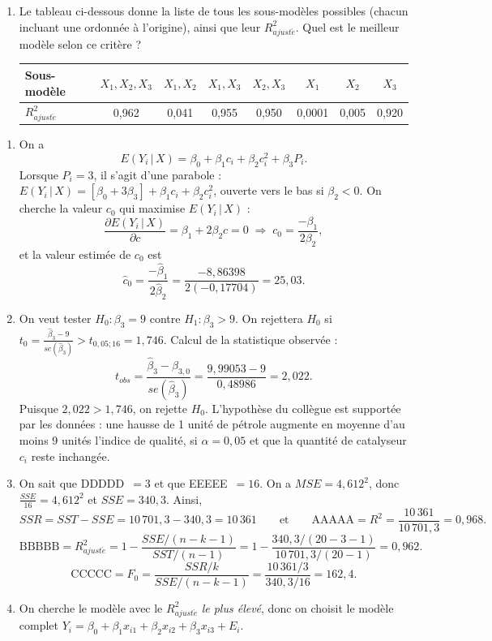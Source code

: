\begin{exercice}
\begin{enumerate}[label=(\alph*)]
  \item Le tableau ci-dessous donne la liste de tous les sous-modèles possibles (chacun
  incluant une ordonnée à l'origine), ainsi que leur $R^2_{ajust\acute e}$. Quel est le
  meilleur modèle selon ce critère ?
  \begin{center}
  \begin{tabular}{l*{7}{c}}
    \toprule
    Sous-modèle & $X_1,X_2,X_3$ & $X_1,X_2$ & $X_1,X_3$ & $X_2,X_3$ & $X_1$ & $X_2$ & $X_3$\\
    \midrule
    $R^2_{ajust\acute e}$ & 0,962 & 0,041 & 0,955 & 0,950 & 0,0001 & 0,005 & 0,920\\
    \bottomrule
  \end{tabular}
  \end{center}
\end{enumerate}
\begin{solution}
\begin{enumerate}[label=(\alph*)]
  \item On a
  \[
    E(Y_i\,|\,X)=\beta_0+\beta_1c_i+\beta_2c_i^2+\beta_3P_i.
  \]
  Lorsque $P_i=3$, il s'agit d'une parabole :
  $E(Y_i\,|\,X)=[\beta_0+3\beta_3]+\beta_1c_i+\beta_2c_i^2$, ouverte vers le bas si
  $\beta_2<0$. On cherche la valeur $c_0$ qui maximise $E(Y_i\,|\,X)$ :
  \[
    \frac{\partial E(Y_i\,|\,X)}{\partial c}=\beta_1+2\beta_2c=0
    \;\Longrightarrow\;c_0=\frac{-\beta_1}{2\beta_2},
  \]
  et la valeur estimée de $c_0$ est
  \[
    \hat c_0=\frac{-\hat\beta_1}{2\hat\beta_2}=\frac{-8,86398}{2(-0,17704)}=25,03.
  \]
  \item On veut tester $H_0:\beta_3=9$ contre $H_1:\beta_3>9$.
  On rejettera $H_0$ si $t_0=\frac{\hat\beta_3-9}{se(\hat\beta_3)}>t_{0,05;16}=1,746$.
  Calcul de la statistique observée :
  \[
    t_{obs}=\frac{\hat\beta_3-\beta_{3,0}}{se(\hat\beta_3)}
    =\frac{9,99053-9}{0,48986}=2,022.
  \]
  Puisque $2,022>1,746$, on rejette $H_0$. L'hypothèse du collègue est supportée par les
  données : une hausse de 1 unité de pétrole augmente en moyenne d'au moins 9 unités
  l'indice de qualité, si $\alpha=0,05$ et que la quantité de catalyseur $c_i$ reste
  inchangée.
  \item On sait que DDDDD~$=3$ et que EEEEE~$=16$. On a $MSE=4,612^2$, donc
  $\frac{SSE}{16}=4,612^2$ et $SSE=340,3$. Ainsi,
  \[
    SSR=SST-SSE=10\,701,3-340,3=10\,361
    \qquad\text{et}\qquad
    \text{AAAAA}=R^2=\frac{10\,361}{10\,701,3}=0,968.
  \]
  \[
    \text{BBBBB}=R^2_{ajust\acute e}=1-\frac{SSE/(n-k-1)}{SST/(n-1)}
    =1-\frac{340,3/(20-3-1)}{10\,701,3/(20-1)}=0,962.
  \]
  \[
    \text{CCCCC}=F_0=\frac{SSR/k}{SSE/(n-k-1)}=\frac{10\,361/3}{340,3/16}=162,4.
  \]
  \item On cherche le modèle avec le $R^2_{ajust\acute e}$ \emph{le plus élevé}, donc on
  choisit le modèle complet $Y_i=\beta_0+\beta_1x_{i1}+\beta_2x_{i2}+\beta_3x_{i3}+E_i$.
\end{enumerate}
\end{solution}
\end{exercice}

